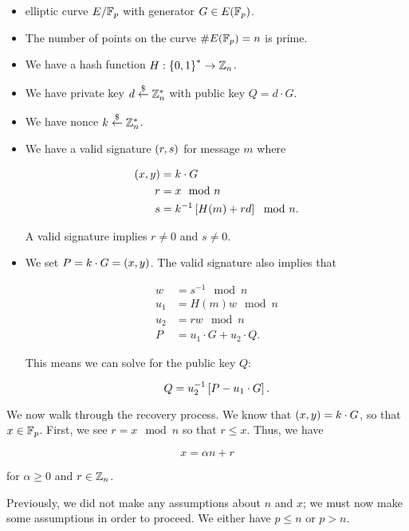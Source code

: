 \begin{itemize}
\item \Gls{elliptic curve} $E/\mathbb{F}_{p}$ with generator $G\in E(\mathbb{F}_{p})$.
\item The number of points on the curve $\#E(\mathbb{F}_{p}) = n$ is prime.
\item We have a \gls{hash function} $H:\left\{ 0,1 \right\}^{*}\to\mathbb{Z}_{n}$.
\item We have private key $d\stackrel{\$}{\leftarrow}{}\mathbb{Z}_{n}^{*}$ with public key
    $Q = d\cdot G$.
\item We have \gls{nonce} $k\stackrel{\$}{\leftarrow}{}\mathbb{Z}_{n}^{*}$.
\item We have a valid signature $\left( r,s \right)$ for message $m$ where

\begin{align}
    \left( x,y \right) &= k\cdot G \nonumber\\
    r &= x \mod n \nonumber\\
    s &= k^{-1}\left[ H(m) + rd \right] \mod n.
\end{align}

A valid signature implies $r\ne0$ and $s\ne0$.
\item We set $P = k\cdot G = \left( x,y \right)$.
    The valid signature also implies that

\begin{align}
    w &= s^{-1} \mod n
        \nonumber\\
    u_{1} &= H(m)w \mod n
        \nonumber\\
    u_{2} &= rw \mod n
        \nonumber\\
    P &= u_{1}\cdot G + u_{2}\cdot Q.
\end{align}

This means we can solve for the public key $Q$:

\begin{equation}
    Q = u_{2}^{-1}\left[ P - u_{1}\cdot G \right].
\end{equation}
\end{itemize}

We now walk through the recovery process.
We know that $\left( x,y \right) = k\cdot G$, so that $x\in\mathbb{F}_{p}$.
First, we see $r = x \mod n$ so that $r\le x$.
Thus, we have

\begin{equation}
    x = \alpha n + r
    \label{eq:recoverable_ecdsa_x_r}
\end{equation}

\noindent
for $\alpha\ge0$ and $r\in\mathbb{Z}_{n}$.

Previously, we did not make any assumptions about
$n$ and $x$;
we must now make some assumptions in order to proceed.
We either have $p\le n$ or $p > n$.

